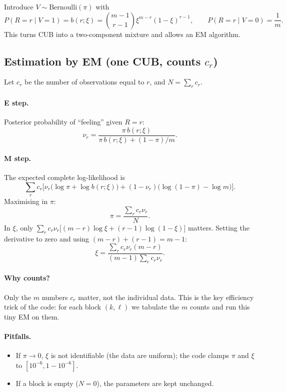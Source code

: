 Introduce $V\sim\text{Bernoulli}(\pi)$ with
\[
P(R=r\mid V=1)=b(r;\xi)=\binom{m-1}{r-1}\xi^{m-r}(1-\xi)^{r-1},
\qquad
P(R=r\mid V=0)=\frac1m.
\]
This turns CUB into a two-component mixture and allows an EM algorithm.

\subsection{Estimation by EM (one CUB, counts $c_r$)}

Let $c_r$ be the number of observations equal to $r$, and $N=\sum_rc_r$.

\paragraph{E step.} Posterior probability of ``feeling'' given $R=r$:
\[
\boxed{
\nu_r
=
\frac{\pi\,b(r;\xi)}{\pi\,b(r;\xi)+(1-\pi)/m}.
}
\]

\paragraph{M step.} The expected complete log-likelihood is
\[
\sum_rc_r\Big[\nu_r\big(\log\pi+\log b(r;\xi)\big)
+(1-\nu_r)\big(\log(1-\pi)-\log m\big)\Big].
\]
Maximising in $\pi$:
\[
\boxed{\pi=\frac{\sum_rc_r\nu_r}{N}.}
\]
In $\xi$, only $\sum_rc_r\nu_r\big[(m-r)\log\xi+(r-1)\log(1-\xi)\big]$
matters. Setting the derivative to zero and using
$(m-r)+(r-1)=m-1$:
\[
\boxed{\xi=\frac{\sum_rc_r\nu_r(m-r)}{(m-1)\sum_rc_r\nu_r}.}
\]

\paragraph{Why counts?}
Only the $m$ numbers $c_r$ matter, not the individual data. This is the key
efficiency trick of the code: for each block $(k,\ell)$ we tabulate the
$m$ counts and run this tiny EM on them.

\paragraph{Pitfalls.}
\begin{itemize}
  \item If $\pi\to0$, $\xi$ is not identifiable (the data are uniform); the
  code clamps $\pi$ and $\xi$ to $[10^{-6},1-10^{-6}]$.
  \item If a block is empty ($N=0$), the parameters are kept unchanged.
\end{itemize}
